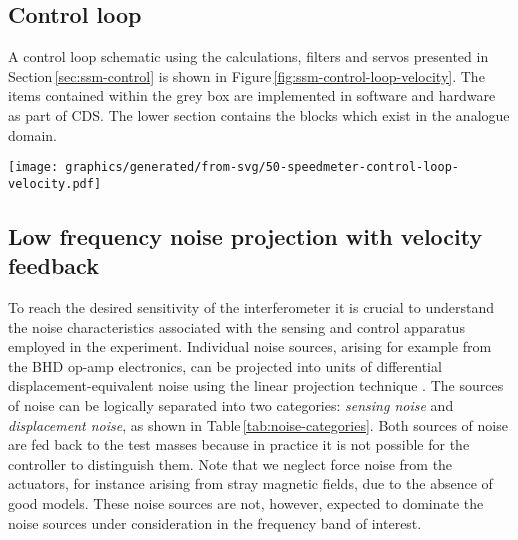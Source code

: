 \subsection{Control loop}

A control loop schematic using the calculations, filters and servos presented in Section\,\ref{sec:ssm-control} is shown in Figure\,\ref{fig:ssm-control-loop-velocity}. The items contained within the grey box are implemented in software and hardware as part of \gls{CDS}. The lower section contains the blocks which exist in the analogue domain.

\begin{sidewaysfigure}
  \texttt{[image: graphics/generated/from-svg/50-speedmeter-control-loop-velocity.pdf]}
  \caption[Modelled \SSMEXPT{} control loop using velocity feedback]{\label{fig:ssm-control-loop-velocity}Simple \SSM{} control loop model. The interferometer plant produces signals representing the probes in the interferometer, and sensing noise is added before the signals are sent to the digital controller, shown in the grey box. Within the controller, the error signal representing \LMINUS{} is fed through a series of filters and sent to the test mass actuators, with the addition of DAC noise. The suspension blocks transform the feedback signals into test mass displacements, and seismic, coating and suspension thermal noise is injected at the input to the interferometer plant. This configuration provides good sensitivity over short periods, but the intrinsic lack of low frequency sensitivity in the main velocity readout leads to drifts causing the arm cavities to lose resonance.}
\end{sidewaysfigure}

\subsection{\label{sec:noise-projection}Low frequency noise projection with velocity feedback}
To reach the desired sensitivity of the interferometer it is crucial to understand the noise characteristics associated with the sensing and control apparatus employed in the experiment. Individual noise sources, arising for example from the \gls{BHD} op-amp electronics, can be projected into units of differential displacement-equivalent noise using the linear projection technique \cite{Smith2006}. The sources of noise can be logically separated into two categories: \emph{sensing noise} and \emph{displacement noise}, as shown in Table\,\ref{tab:noise-categories}. Both sources of noise are fed back to the test masses because in practice it is not possible for the controller to distinguish them. Note that we neglect force noise from the actuators, for instance arising from stray magnetic fields, due to the absence of good models. These noise sources are not, however, expected to dominate the noise sources under consideration in the frequency band of interest.

